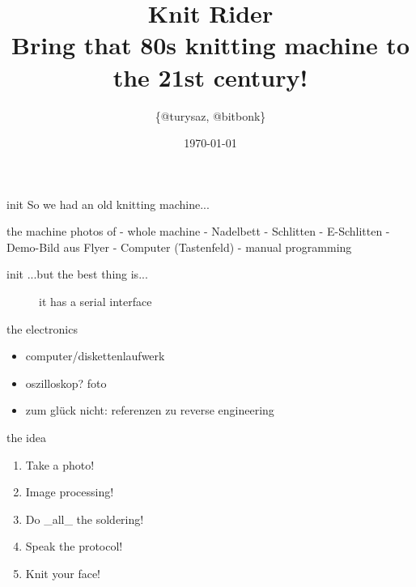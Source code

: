 


\author{\{@turysaz, @bitbonk\}}
\title{\Huge{Knit Rider}\\
    \large{Bring that 80s knitting machine to the 21st century!}
}

\date{\today{}}



\maketitle

\begin{frame}{init}
      So we had an old knitting machine...
\end{frame}

\begin{frame}{the machine}
photos of
- whole machine
- Nadelbett
- Schlitten
- E-Schlitten
- Demo-Bild aus Flyer
- Computer (Tastenfeld)
- manual programming
\end{frame}

\begin{frame}{init}
    ...but the best thing is...\pause
    \begin{figure}
        \caption{it has a serial interface }
    \end{figure}
\end{frame}


\begin{frame}{the electronics}
    \begin{itemize}
        \item computer/diskettenlaufwerk
        \item oszilloskop? foto
        \item zum glück nicht: referenzen zu reverse engineering
    \end{itemize}
\end{frame}


\begin{frame}{the idea}
    \begin{enumerate}[<+->]
        \item Take a photo!
        \item Image processing!
        \item Do \_all\_ the soldering!
        \item Speak the protocol!
        \item Knit your face!
    \end{enumerate}
\end{frame}

